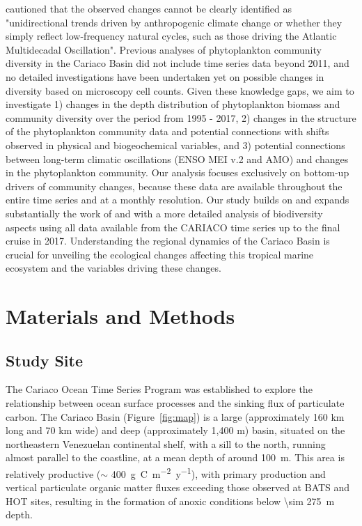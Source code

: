 \documentclass[draft]{agujournal2019}
\begin{document}
     cautioned that the observed changes cannot be clearly identified as "unidirectional trends driven by anthropogenic climate change or whether they simply reflect low-frequency natural cycles, such as those driving the Atlantic Multidecadal Oscillation".
    Previous analyses of phytoplankton community diversity in the Cariaco Basin did not include time series data beyond 2011, and no detailed investigations have been undertaken yet on possible changes in diversity based on microscopy cell counts.
    Given these knowledge gaps, we aim to investigate 1) changes in the depth distribution of phytoplankton biomass and community diversity over the period from 1995 - 2017, 2) changes in the structure of the phytoplankton community data and potential connections with shifts observed in physical and biogeochemical variables, and 3) potential connections between long-term climatic oscillations (ENSO MEI v.2 and AMO) and changes in the phytoplankton community.
    Our analysis focuses exclusively on bottom-up drivers of community changes, because these data are available throughout the entire time series and at a monthly resolution. Our study builds on and expands substantially the work of  and  with a more detailed analysis of biodiversity aspects using all data available from the CARIACO time series up to the final cruise in 2017. Understanding the regional dynamics of the Cariaco Basin is crucial for unveiling the ecological changes affecting this tropical marine ecosystem and the variables driving these changes. 
        
   


\section{Materials and Methods}
%
\subsection{Study Site}
    The Cariaco Ocean Time Series Program was established to explore the relationship between ocean surface processes and the sinking flux of particulate carbon. The Cariaco Basin (Figure~\ref{fig:map}) is a large (approximately 160 km long and 70 km wide) and deep (approximately 1,400 m) basin, situated on the northeastern Venezuelan continental shelf, with a sill to the north, running almost parallel to the coastline, at a mean depth of around \qty{100}{m}. This area is relatively productive ($\sim$ \qty{400}{g.C.m^{-2}.y^{-1}}), with primary production and vertical particulate organic matter fluxes exceeding those observed at BATS and HOT sites, resulting in the formation of anoxic conditions below \qty{\sim 275}{m} depth.
\end{document}
